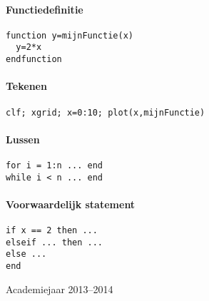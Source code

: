 \documentclass[10pt]{article}
\begin{document}
\vspace{0.5cm}

\paragraph{Functiedefinitie}
\begin{center}
\begin{minipage}{.6\linewidth}
\begin{lstlisting}
function y=mijnFunctie(x)
  y=2*x
endfunction
\end{lstlisting}
\end{minipage}
\end{center}


\paragraph{Tekenen}
\begin{center}
\begin{minipage}{.6\linewidth}
\begin{lstlisting}
clf; xgrid; x=0:10; plot(x,mijnFunctie)
\end{lstlisting}
\end{minipage}
\end{center}


\paragraph{Lussen}
\begin{center}
\begin{minipage}{.6\linewidth}
\begin{lstlisting}
for i = 1:n ... end
while i < n ... end
\end{lstlisting}
\end{minipage}
\end{center}

\paragraph{Voorwaardelijk statement}
\begin{center}
\begin{minipage}{.6\linewidth}
\begin{lstlisting}
if x == 2 then ...
elseif ... then ...
else ...
end
\end{lstlisting}
\end{minipage}
\end{center}

\vfill
\begin{center}  Academiejaar 2013--2014 \end{center}

\end{document}
